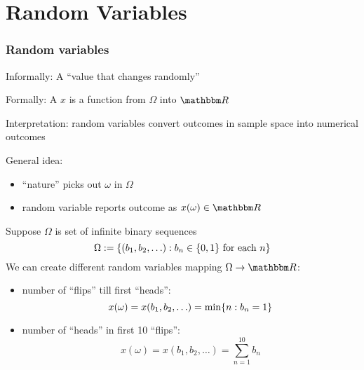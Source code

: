 \section{Random Variables}

\begin{frame}

    \vspace{2em}
    \frametitle{Random variables}

    Informally: A ``value that changes randomly'' 
    
    Formally: A  $x$ is a function from $\Omega$ into $\RR$
    
    Interpretation: random variables convert outcomes in sample space into
    numerical outcomes

    General idea: 
    \begin{itemize}
        \item``nature''  picks out $\omega$ in $\Omega$ 
        \item random variable reports outcome as $x(\omega) \in \RR$
    \end{itemize}    
    
\end{frame}

\begin{frame}

    \vspace{2em}
    \Eg
        Suppose $\Omega$ is set of infinite binary sequences
        \begin{equation*}
            \Omega := \{ (b_1, b_2, \ldots) : b_n \in \{0, 1\} \text{ for each } n \}
        \end{equation*}
        We can create different random variables mapping $\Omega \to \RR$:
        \begin{itemize}
            \item number of ``flips'' till first ``heads'':
                \begin{equation*}
                    x(\omega) = x(b_1, b_2, \ldots) = \min \{ n : b_n = 1 \}
                \end{equation*}
            \item number of ``heads'' in first 10 ``flips'':
                \begin{equation*}
                    x(\omega) = x(b_1, b_2, \ldots) = \sum_{n=1}^{10} b_n 
                \end{equation*}
        \end{itemize}
        
\end{frame}


